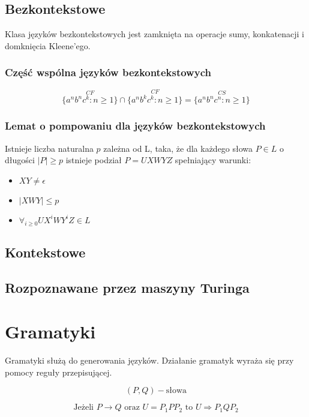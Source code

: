 \documentclass{../notatki}
\begin{document}
\subsection{Bezkontekstowe}

Klasa języków bezkontekstowych jest zamknięta na operacje sumy, konkatenacji
i domknięcia Kleene'ego.

\subsubsection{Część wspólna języków bezkontekstowych}

$$
\stackrel{CF}{\{a^nb^nc^k : n \ge 1 \}} \cap \stackrel{CF}{\{a^nb^kc^k : n \ge 1
\}} = \stackrel{CS}{\{a^nb^nc^n : n \ge 1\}}
$$

\subsubsection{Lemat o pompowaniu dla języków bezkontekstowych}

Istnieje liczba naturalna $p$ zależna od L, taka, że dla każdego słowa $P \in L$
o długości $|P| \ge p$ istnieje podział $P = UXWYZ$ spełniający warunki:

\begin{itemize}
  \item $XY \ne \epsilon$
  \item $|XWY| \le p$
  \item $\forall_{i \ge 0} UX^iWY^iZ \in L$
\end{itemize}

\subsection{Kontekstowe}

\subsection{Rozpoznawane przez maszyny Turinga}

\section{Gramatyki}

Gramatyki służą do generowania języków.
Działanie gramatyk wyraża się przy pomocy reguły przepisującej.

$$
(P, Q) - \text{słowa}
$$

$$
\text{Jeżeli } P \rightarrow Q \text{ oraz } U = P_1PP_2 \text{ to }
U \Rightarrow P_1QP_2
$$
\end{document}
